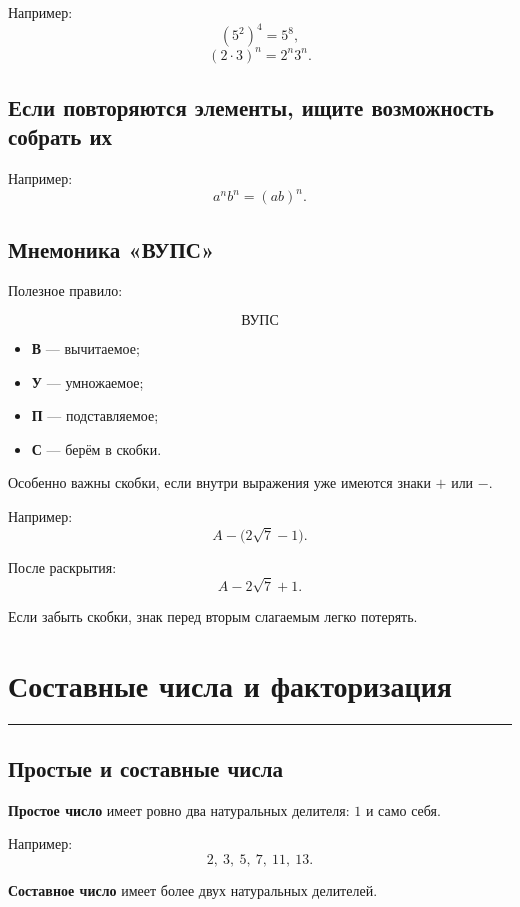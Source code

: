\documentclass[a4paper,12pt]{article}
\newcommand{\lessonrule}{%
  \par\vspace{0.3em}
  {\color{accent}\rule{\linewidth}{0.6pt}}
  \vspace{0.5em}
}
\newcommand{\important}[1]{\textbf{\color{darkaccent}#1}}
\begin{document}
Например:
\[
(5^2)^4=5^8,
\]
\[
(2\cdot3)^n=2^n3^n.
\]

\subsection*{\color{accent}Если повторяются элементы, ищите возможность собрать их}

Например:
\[
a^n b^n=(ab)^n.
\]

\subsection*{\color{accent}Мнемоника «ВУПС»}

Полезное правило:

\[
\boxed{\text{ВУПС}}
\]

\begin{itemize}
  \item \textbf{В} --- вычитаемое;
  \item \textbf{У} --- умножаемое;
  \item \textbf{П} --- подставляемое;
  \item \textbf{С} --- берём в скобки.
\end{itemize}

Особенно важны скобки, если внутри выражения уже имеются знаки
\(+\) или \(-\).

Например:
\[
A-\bigl(2\sqrt7-1\bigr).
\]

После раскрытия:
\[
A-2\sqrt7+1.
\]

Если забыть скобки, знак перед вторым слагаемым легко потерять.

\section*{\color{darkaccent}Составные числа и факторизация}
\lessonrule

\subsection*{\color{accent}Простые и составные числа}

\important{Простое число} имеет ровно два натуральных делителя:
\(1\) и само себя.

Например:
\[
2,\ 3,\ 5,\ 7,\ 11,\ 13.
\]

\important{Составное число} имеет более двух натуральных делителей.
\end{document}
